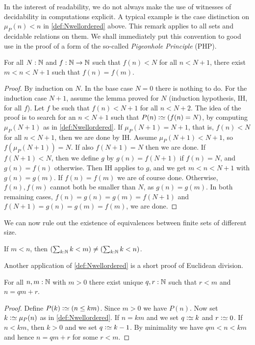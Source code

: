 \begin{remark}\label{rem:computations-can-decide}
In the interest of readability, we do not always make the use
of witnesses of decidability in computations explicit.
A typical example is the case distinction on $\mu_P(n) < n$ in
\cref{def:Nwellordered} above. This remark applies to all
sets and decidable relations on them. We shall immediately put
this convention to good use in the proof of a form of the so-called
\emph{Pigeonhole Principle} (PHP).
\end{remark}

\begin{lemma}\label{lem:PHP}
For all $N:\mathbb{N}$ and $f:\mathbb{N}\to\mathbb{N}$ such that $f(n)<N$
for all $n<N+1$, there exist $m < n < N+1$ such that $f(n)=f(m)$.
\end{lemma}
\begin{proof}
By induction on $N$. In the base case $N=0$ there is nothing to do.
For the induction case $N+1$, assume the lemma proved for $N$
(induction hypothesis, IH, for all $f$). Let $f$ be such
that $f(n)<N+1$ for all $n<N+2$. The idea of the proof is
to search for an $n<N+1$ such that $P(n)\defeq (f(n)=N)$,
by computing $\mu_P(N+1)$ as in \cref{def:Nwellordered}.
If $\mu_P(N+1)=N+1$, that is, $f(n)<N$ for all $n<N+1$,
then we are done by IH. Assume $\mu_P(N+1) < N+1$,
so $f(\mu_P(N+1))=N$.
If also $f(N+1)=N$ then we are done.
If $f(N+1)<N$, then we define $g$ by $g(n)=f(N+1)$
if $f(n)= N$, and $g(n)=f(n)$ otherwise.
Then IH applies to $g$, and we get $m < n < N+1$ with
$g(n)=g(m)$. If $f(n)=f(m)$ we are of course done.
Otherwise, $f(n),f(m)$ cannot both be smaller than $N$,
as $g(n)=g(m)$. In both remaining cases,
$f(n)=g(n)=g(m)=f(N+1)$ and $f(N+1)=g(n)=g(m)=f(m)$,
we are done.
\end{proof}

We can now rule out the existence of equivalences between finite
sets of different size.
\begin{corollary}\label{cor:Fin-n-injective}
If $m<n$, then $(\sum_{k:\mathbb{N}} k<m) \neq (\sum_{k:\mathbb{N}} k<n)$.
\end{corollary}

Another application of \cref{def:Nwellordered} is a
short proof of Euclidean division.
\begin{lemma}\label{lem:euclid-div}
  For all $n,m:\mathbb{N}$ with $m>0$ there exist unique $q,r:\mathbb{N}$
  such that $r<m$ and $n=qm+r$.
\end{lemma}
\begin{proof}
Define $P(k)\defeq (n\leq km)$. Since $m>0$ we have $P(n)$.
Now set $k\defeq\mu_P(n)$ as in \cref{def:Nwellordered}.
If $n=km$ and we set $q\defeq k$ and $r\defeq 0$.
If $n<km$, then $k>0$ and we set $q\defeq k-1$.
By minimality we have $qm<n<km$ and hence $n=qm+r$ for some $r<m$.
\end{proof}

